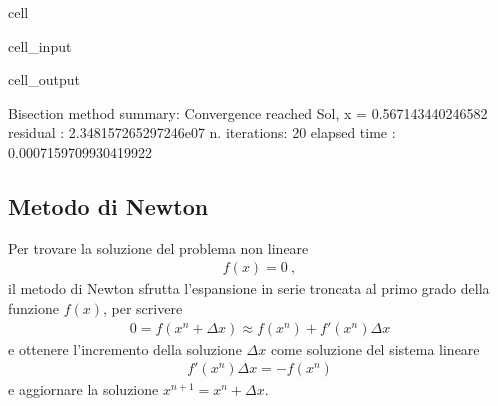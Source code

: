 \documentclass[letterpaper,10pt,italian]{jupyterBook}
\begin{document}
\begin{sphinxuseclass}{cell}
\begin{sphinxVerbatimInput}
\begin{sphinxuseclass}{cell_input}
\end{sphinxuseclass}\end{sphinxVerbatimInput}
\begin{sphinxVerbatimOutput}

\begin{sphinxuseclass}{cell_output}
\begin{sphinxVerbatim}[commandchars=\\\{\}]
Bisection method summary: 
Convergence reached
Sol, x = \PYGZhy{}0.567143440246582
residual     : \PYGZhy{}2.348157265297246e\PYGZhy{}07
n. iterations: 20
elapsed time : 0.0007159709930419922
\end{sphinxVerbatim}

\end{sphinxuseclass}\end{sphinxVerbatimOutput}

\end{sphinxuseclass}

\subsection{Metodo di Newton}
\label{\detokenize{ch/numerics/nonlinear:metodo-di-newton}}
\sphinxAtStartPar
Per trovare la soluzione del problema non lineare
\begin{equation*}
\begin{split}f(x) = 0 \ ,\end{split}
\end{equation*}
\sphinxAtStartPar
il metodo di Newton sfrutta l’espansione in serie troncata al primo grado della funzione \(f(x)\), per scrivere
\begin{equation*}
\begin{split}0 = f(x^n + \Delta x) \approx f(x^n) + f'(x^n) \Delta x \end{split}
\end{equation*}
\sphinxAtStartPar
e ottenere l’incremento della soluzione \(\Delta x\) come soluzione del sistema lineare
\begin{equation*}
\begin{split}f'(x^n) \Delta x = -f(x^n)\end{split}
\end{equation*}
\sphinxAtStartPar
e aggiornare la soluzione \(x^{n+1} = x^{n} + \Delta x\).
\end{document}
